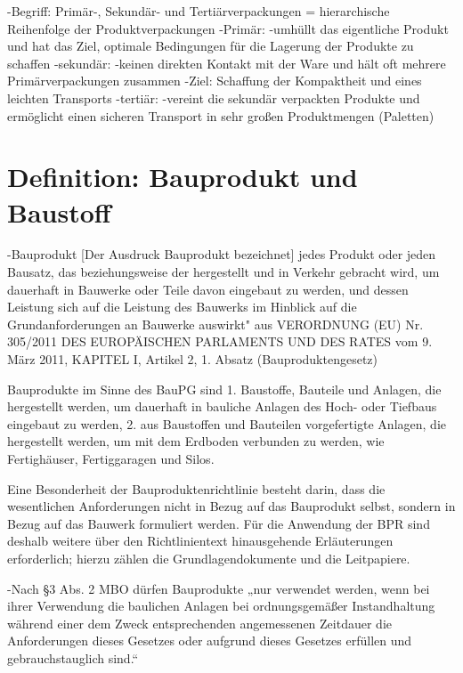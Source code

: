 -Begriff: Primär-, Sekundär- und Tertiärverpackungen %
    = hierarchische Reihenfolge der Produktverpackungen
    -Primär:
        -umhüllt das eigentliche Produkt und hat das Ziel, optimale Bedingungen für die Lagerung der Produkte zu schaffen
    -sekundär:
        -keinen direkten Kontakt mit der Ware und hält oft mehrere Primärverpackungen zusammen
        -Ziel: Schaffung der Kompaktheit und eines leichten Transports
    -tertiär:
        -vereint die sekundär verpackten Produkte und ermöglicht einen sicheren Transport in sehr großen Produktmengen (Paletten)


\section{Definition: Bauprodukt und Baustoff}
\label{sec:Definition: Bauprodukt und Baustoff}

    -Bauprodukt
           [Der Ausdruck Bauprodukt bezeichnet] jedes Produkt oder jeden Bausatz, das beziehungsweise der hergestellt und in Verkehr gebracht wird, um dauerhaft in Bauwerke oder Teile davon eingebaut zu werden, und dessen Leistung sich auf die Leistung des Bauwerks im Hinblick auf die Grundanforderungen an Bauwerke auswirkt" aus VERORDNUNG (EU) Nr. 305/2011 DES EUROPÄISCHEN PARLAMENTS UND DES RATES vom 9. März 2011, KAPITEL I, Artikel 2, 1. Absatz (Bauproduktengesetz)
           
           Bauprodukte im Sinne des BauPG sind 
                1. Baustoffe, Bauteile und Anlagen, die hergestellt werden, um dauerhaft in bauliche Anlagen des Hoch- oder Tiefbaus eingebaut zu werden, 
                2. aus Baustoffen und Bauteilen vorgefertigte Anlagen, die hergestellt werden, um mit dem Erdboden verbunden zu werden, wie Fertighäuser, Fertiggaragen und Silos.
                
                Eine Besonderheit der Bauproduktenrichtlinie besteht darin, dass die wesentlichen Anforderungen nicht in Bezug auf das Bauprodukt selbst, sondern in Bezug auf das Bauwerk formuliert werden. Für die Anwendung der BPR sind deshalb weitere über den Richtlinientext hinausgehende Erläuterungen erforderlich; hierzu zählen die Grundlagendokumente und die Leitpapiere.
        
                    -Nach §3 Abs. 2 MBO dürfen Bauprodukte „nur verwendet werden, wenn bei ihrer Verwendung die baulichen Anlagen bei ordnungsgemäßer Instandhaltung während einer dem Zweck entsprechenden angemessenen Zeitdauer die Anforderungen dieses Gesetzes oder aufgrund dieses Gesetzes erfüllen und gebrauchstauglich sind.“
            

